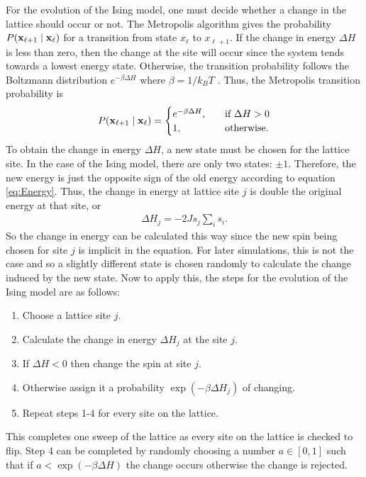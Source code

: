 \documentclass[11pt]{article}
\begin{document}
For the evolution of the Ising model, one must decide whether a change in the lattice should occur or not. The Metropolis algorithm gives the probability $P(\vb{x}_{\ell+1}\mid \vb{x}_\ell)$ for a transition from state $x_\ell$ to $x_{\ell+1}$. If the change in energy $\Delta H$ is less than zero, then the change at the site will occur since the system tends towards a lowest energy state. Otherwise, the transition probability follows the Boltzmann distribution $e^{-\beta\Delta H}$ where $\beta=1/k_BT$ \cite{IsingModelBook}. Thus, the Metropolis transition probability is
\begin{align}
	P(\vb{x}_{\ell+1}\mid \vb{x}_\ell)=
	\begin{cases}
		e^{-\beta\Delta H},\quad&\text{if }\Delta H>0\\
		1,&\text{otherwise.}
	\end{cases}
	\label{eq:ProbIsing}
\end{align}
To obtain the change in energy $\Delta H$, a new state must be chosen for the lattice site. In the case of the Ising model, there are only two states: $\pm1$. Therefore, the new energy is just the opposite sign of the old energy according to equation \ref{eq:Energy}. Thus, the change in energy at lattice site $j$ is double the original energy at that site, or
\begin{align}
	\Delta H_j=-2Js_j\sum_is_i.
	\label{eq:DeltaH}
\end{align}
So the change in energy can be calculated this way since the new spin being chosen for site $j$ is implicit in the equation. For later simulations, this is not the case and so a slightly different state is chosen randomly to calculate the change induced by the new state. Now to apply this, the steps for the evolution of the Ising model are as follows:
\begin{enumerate}
\item Choose a lattice site $j$.
\item Calculate the change in energy $\Delta H_j$ at the site $j$.
\item If $\Delta H<0$ then change the spin at site $j$.
\item Otherwise assign it a probability $\exp(-\beta\Delta H_j)$ of changing.
\item Repeat steps 1-4 for every site on the lattice.
\end{enumerate}

This completes one sweep of the lattice as every site on the lattice is checked to flip. Step 4 can be completed by randomly choosing a number $a\in[0,1]$ such that if $a<\exp(-\beta\Delta H)$ the change occurs otherwise the change is rejected.
\end{document}
